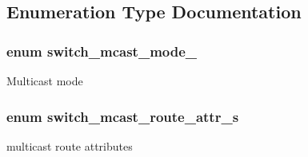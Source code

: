 \subsection{Enumeration Type Documentation}
\hypertarget{group__MULTICAST_gae6d9578ab942865212c38f150d50cdf8}{
\subsubsection[{switch\+\_\+mcast\+\_\+mode\+\_\+}]{\setlength{\rightskip}{0pt plus 5cm}enum {\bf switch\+\_\+mcast\+\_\+mode\+\_\+}}}\label{group__MULTICAST_gae6d9578ab942865212c38f150d50cdf8}
Multicast mode \hypertarget{group__MULTICAST_gac149f82b4265da38bcb13f6745749e2e}{
\subsubsection[{switch\+\_\+mcast\+\_\+route\+\_\+attr\+\_\+s}]{\setlength{\rightskip}{0pt plus 5cm}enum {\bf switch\+\_\+mcast\+\_\+route\+\_\+attr\+\_\+s}}}\label{group__MULTICAST_gac149f82b4265da38bcb13f6745749e2e}
multicast route attributes 

